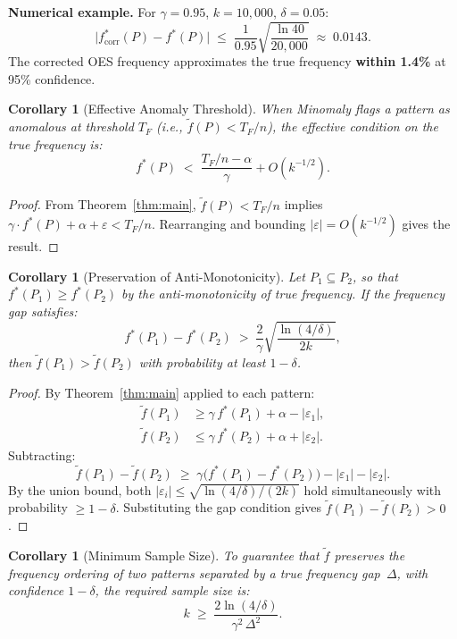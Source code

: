 \documentclass[11pt,a4paper]{article}
\theoremstyle{plain}
\newtheorem{corollary}[theorem]{Corollary}
\theoremstyle{definition}
\newcommand{\freq}{\tilde{f}}
\newcommand{\fstar}{f^*}
\begin{document}
\noindent\textbf{Numerical example.} For $\gamma = 0.95$, $k = 10{,}000$, $\delta = 0.05$:
\[
\big|\fstar_{\mathrm{corr}}(P) - \fstar(P)\big| \;\leq\; \frac{1}{0.95}\sqrt{\frac{\ln 40}{20{,}000}} \;\approx\; 0.0143.
\]
The corrected OES frequency approximates the true frequency \textbf{within 1.4\%} at 95\% confidence.

\begin{corollary}[Effective Anomaly Threshold]\label{cor:threshold}
When Minomaly flags a pattern as anomalous at threshold $T_F$ (i.e., $\freq(P) < T_F/n$), the effective condition on the true frequency is:
\[
\fstar(P) \;<\; \frac{T_F/n - \alpha}{\gamma} + O(k^{-1/2}).
\]
\end{corollary}

\begin{proof}
From Theorem~\ref{thm:main}, $\freq(P) < T_F/n$ implies $\gamma\cdot\fstar(P) + \alpha + \varepsilon < T_F/n$. Rearranging and bounding $|\varepsilon| = O(k^{-1/2})$ gives the result.
\end{proof}

\begin{corollary}[Preservation of Anti-Monotonicity]\label{cor:antimon}
Let $P_1 \subseteq P_2$, so that $\fstar(P_1) \geq \fstar(P_2)$ by the anti-monotonicity of true frequency. If the frequency gap satisfies:
\[
\fstar(P_1) - \fstar(P_2) \;>\; \frac{2}{\gamma}\sqrt{\frac{\ln(4/\delta)}{2k}},
\]
then $\freq(P_1) > \freq(P_2)$ with probability at least $1 - \delta$.
\end{corollary}

\begin{proof}
By Theorem~\ref{thm:main} applied to each pattern:
\begin{align*}
\freq(P_1) &\geq \gamma\,\fstar(P_1) + \alpha - |\varepsilon_1|, \\
\freq(P_2) &\leq \gamma\,\fstar(P_2) + \alpha + |\varepsilon_2|.
\end{align*}
Subtracting:
\[
\freq(P_1) - \freq(P_2) \;\geq\; \gamma\big(\fstar(P_1) - \fstar(P_2)\big) - |\varepsilon_1| - |\varepsilon_2|.
\]
By the union bound, both $|\varepsilon_i| \leq \sqrt{\ln(4/\delta)/(2k)}$ hold simultaneously with probability $\geq 1 - \delta$. Substituting the gap condition gives $\freq(P_1) - \freq(P_2) > 0$.
\end{proof}

\begin{corollary}[Minimum Sample Size]\label{cor:kmin}
To guarantee that $\freq$ preserves the frequency ordering of two patterns separated by a true frequency gap~$\Delta$, with confidence $1 - \delta$, the required sample size is:
\[
k \;\geq\; \frac{2\ln(4/\delta)}{\gamma^2\,\Delta^2}.
\]
\end{corollary}
\end{document}
